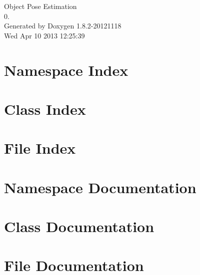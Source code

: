 \documentclass{book}
\begin{document}
\hypersetup{pageanchor=false,citecolor=blue}
\begin{titlepage}
\vspace*{7cm}
\begin{center}
{\Large Object Pose Estimation \\[1ex]\large 0. }\\
\vspace*{1cm}
{\large Generated by Doxygen 1.8.2-20121118}\\
\vspace*{0.5cm}
{\small Wed Apr 10 2013 12:25:39}\\
\end{center}
\end{titlepage}
\clearemptydoublepage
{}
\tableofcontents
\clearemptydoublepage
{}
\hypersetup{pageanchor=true,citecolor=blue}
\chapter{Namespace Index}

\chapter{Class Index}

\chapter{File Index}

\chapter{Namespace Documentation}

\chapter{Class Documentation}
















\chapter{File Documentation}


\printindex
\end{document}
